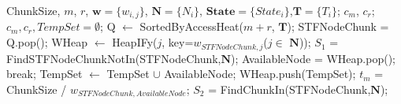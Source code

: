 \renewcommand{\algorithmicrequire}{\textbf{Input:}} %
\renewcommand{\algorithmicensure}{\textbf{Output:}}


\begin{algorithm}[htpb]
	\begin{algorithmic}[1]
		\newlength{\commentindent}
		\setlength{\commentindent}{.3\textwidth}
		\setlength{\algorithmicindent}{1.5em}
		\renewcommand{\algorithmiccomment}[1]{\unskip\hfill\makebox[\commentindent][l]{$\rhd$~#1}\par}
		\LetLtxMacro{\oldalgorithmic}{\algorithmic}
		\renewcommand{\algorithmic}[1][0]{
			\oldalgorithmic[#1]
			\renewcommand{\ALC@com}[1]{
				\IFnum\pdfstrcmp{##1}{default}=0\ELSE\algorithmiccomment{##1}\fi}%
		}

		\REQUIRE
		ChunkSize, $m$, $r$, $\textbf{w}= \{ w_{i,j} \}$, $\textbf{N}= \{ N_{i} \}$, $\textbf{State}= \{ State_{i} \}$,$\textbf{T}= \{ T_{i} \}$;
		\ENSURE
		$c_m$, $c_r$;
		\STATE $c_m,c_r,TempSet = \emptyset$;
		\STATE Q $\gets$ SortedByAccessHeat($m+r$, $\textbf{T}$);
		\STATE STFNodeChunk = Q.pop();
		\STATE WHeap $\gets$ HeapIFy($j$, key=$w_{STFNodeChunk,j}$($ j \in$ $\textbf{N}$));
		\STATE $S_1$ = FindSTFNodeChunkNotIn(STFNodeChunk,$\textbf{N}$);
		\STATE  AvailableNode = WHeap.pop(); 
		\STATE break;
		\ELSE
		\STATE TempSet $\gets$ TempSet $\cup$ AvailableNode;
		\ENDIF
		\ENDWHILE
		\STATE WHeap.push(TempSet);
		\STATE $t_m$ = ChunkSize / $w_{STFNodeChunk,AvailableNode}$;
		\STATE $S_2$ = FindChunkIn(STFNodeChunk,$\textbf{N}$);


\end{algorithmic}
\end{algorithm}
